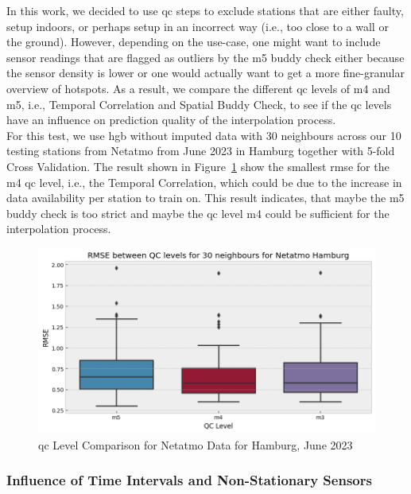 In this work, we decided to use \gls{qc} steps to exclude stations that are either faulty, setup indoors, or perhaps setup in an incorrect way (i.e., too close to a wall or the ground). However, depending on the use-case, one might want to include sensor readings that are flagged as outliers by the m5 buddy check either because the sensor density is lower or one would actually want to get a more fine-granular overview of hotspots. As a result, we compare the different \gls{qc} levels of m4 and m5, i.e., Temporal Correlation and Spatial Buddy Check, to see if the \gls{qc} levels have an influence on prediction quality of the interpolation process.\\
For this test, we use \gls{hgb} without imputed data with 30 neighbours across our 10 testing stations from Netatmo from June 2023 in Hamburg together with 5-fold Cross Validation. The result shown in Figure~\ref{fig:qc hamburg level comparison} show the smallest \gls{rmse} for the m4 \gls{qc} level, i.e., the Temporal Correlation, which could be due to the increase in data availability per station to train on. This result indicates, that maybe the m5 buddy check is too strict and maybe the \gls{qc} level m4 could be sufficient for the interpolation process.

\begin{figure}[ht]
    \centering
    \includegraphics[width=1\textwidth]{images/qc_hamburg_level_comparison.png}
    \caption{\gls{qc} Level Comparison for Netatmo Data for Hamburg, June 2023}
    \label{fig:qc hamburg level comparison}
\end{figure}

\subsubsection{Influence of Time Intervals and Non-Stationary Sensors}

